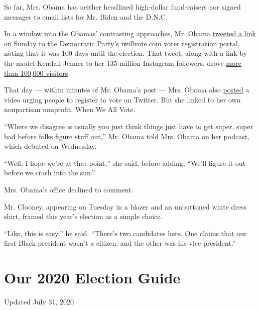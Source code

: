 So far, Mrs. Obama has neither headlined high-dollar fund-raisers nor
signed messages to email lists for Mr. Biden and the D.N.C.

In a window into the Obamas' contrasting approaches, Mr. Obama
\href{https://twitter.com/BarackObama/status/1287417455447552002}{tweeted
a link} on Sunday to the Democratic Party's iwillvote.com voter
registration portal, noting that it was 100 days until the election.
That tweet, along with a link by the model Kendall Jenner to her 135
million Instagram followers, drove
\href{https://twitter.com/MegDiMartino/status/1287571323246583812}{more
than 100,000 visitors}.

That day --- within minutes of Mr. Obama's post --- Mrs. Obama also
\href{https://twitter.com/MichelleObama/status/1287419441320517633}{posted}
a video urging people to register to vote on Twitter. But she linked to
her own nonpartisan nonprofit, When We All Vote.

``Where we disagree is usually you just think things just have to get
super, super bad before folks figure stuff out,'' Mr. Obama told Mrs.
Obama on her podcast, which debuted on Wednesday.

``Well, I hope we're at that point,'' she said, before adding, ``We'll
figure it out before we crash into the sun.''

Mrs. Obama's office declined to comment.

Mr. Clooney, appearing on Tuesday in a blazer and an unbuttoned white
dress shirt, framed this year's election as a simple choice.

``Like, this is easy,'' he said. ``There's two candidates here. One
claims that our first Black president wasn't a citizen, and the other
was his vice president.''

\hypertarget{our-2020-election-guide}{%
\section{Our 2020 Election Guide}\label{our-2020-election-guide}}

Updated July 31, 2020

